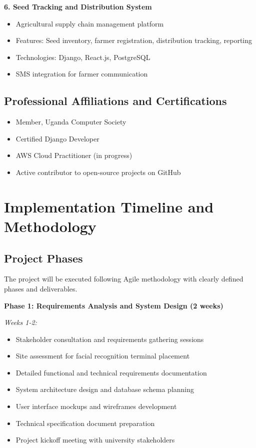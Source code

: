 \documentclass[12pt]{article}
\begin{document}
\textbf{6. Seed Tracking and Distribution System}
\begin{itemize}[noitemsep]
\item Agricultural supply chain management platform
\item Features: Seed inventory, farmer registration, distribution tracking, reporting
\item Technologies: Django, React.js, PostgreSQL
\item SMS integration for farmer communication
\end{itemize}

\subsection{Professional Affiliations and Certifications}

\begin{itemize}[noitemsep]
\item Member, Uganda Computer Society
\item Certified Django Developer
\item AWS Cloud Practitioner (in progress)
\item Active contributor to open-source projects on GitHub
\end{itemize}

\section{Implementation Timeline and Methodology}

\subsection{Project Phases}

The project will be executed following Agile methodology with clearly defined phases and deliverables.

\textbf{Phase 1: Requirements Analysis and System Design (2 weeks)}

\textit{Weeks 1-2:}
\begin{itemize}[noitemsep]
\item Stakeholder consultation and requirements gathering sessions
\item Site assessment for facial recognition terminal placement
\item Detailed functional and technical requirements documentation
\item System architecture design and database schema planning
\item User interface mockups and wireframes development
\item Technical specification document preparation
\item Project kickoff meeting with university stakeholders
\end{itemize}
\end{document}
